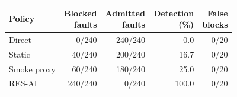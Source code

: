 \begin{tabular}{lrrrr}
\toprule Policy & \shortstack{Blocked\\faults} & \shortstack{Admitted\\faults} & \shortstack{Detection\\(\%)} & \shortstack{False\\blocks} \\
\midrule
Direct & 0/240 & 240/240 & 0.0 & 0/20 \\
Static & 40/240 & 200/240 & 16.7 & 0/20 \\
Smoke proxy & 60/240 & 180/240 & 25.0 & 0/20 \\
RES-AI & 240/240 & 0/240 & 100.0 & 0/20 \\
\bottomrule
\end{tabular}
